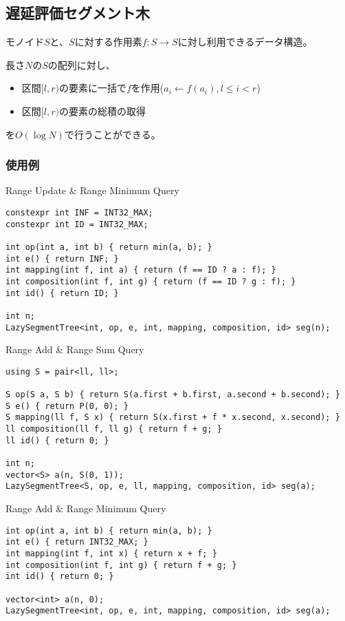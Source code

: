 \subsection{遅延評価セグメント木}

モノイド$S$と、$S$に対する作用素$f:S \rightarrow S$に対し利用できるデータ構造。

長さ$N$の$S$の配列に対し、
%
\begin{itemize}
    \item 区間$[l,r)$の要素に一括で$f$を作用($a_i \leftarrow f(a_i), l \le i < r$)
    \item 区間$[l,r)$の要素の総積の取得
\end{itemize}
%
を$O(\log N)$で行うことができる。



\subsubsection{使用例}

Range Update \& Range Minimum Query

\begin{lstlisting}
constexpr int INF = INT32_MAX;
constexpr int ID = INT32_MAX;

int op(int a, int b) { return min(a, b); }
int e() { return INF; }
int mapping(int f, int a) { return (f == ID ? a : f); }
int composition(int f, int g) { return (f == ID ? g : f); }
int id() { return ID; }

int n;
LazySegmentTree<int, op, e, int, mapping, composition, id> seg(n);
\end{lstlisting}

Range Add \& Range Sum Query

\begin{lstlisting}
using S = pair<ll, ll>;

S op(S a, S b) { return S(a.first + b.first, a.second + b.second); }
S e() { return P(0, 0); }
S mapping(ll f, S x) { return S(x.first + f * x.second, x.second); }
ll composition(ll f, ll g) { return f + g; }
ll id() { return 0; }

int n;
vector<S> a(n, S(0, 1));
LazySegmentTree<S, op, e, ll, mapping, composition, id> seg(a);
\end{lstlisting}

Range Add \& Range Minimum Query

\begin{lstlisting}
int op(int a, int b) { return min(a, b); }
int e() { return INT32_MAX; }
int mapping(int f, int x) { return x + f; }
int composition(int f, int g) { return f + g; }
int id() { return 0; }

vector<int> a(n, 0);
LazySegmentTree<int, op, e, int, mapping, composition, id> seg(a);
\end{lstlisting}


